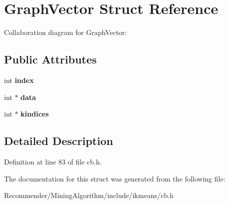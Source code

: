 \section{GraphVector Struct Reference}
\label{structGraphVector}
Collaboration diagram for GraphVector:\subsection*{Public Attributes}
\begin{CompactItemize}
\item 
int {\bf index}\label{structGraphVector_750b5d744c39a06bfb13e6eb010e35d0}

\item 
int $\ast$ {\bf data}\label{structGraphVector_c103627c1ad15cbec2f22d0abe6d54b6}

\item 
int $\ast$ {\bf kindices}\label{structGraphVector_5027d41ca8be64fce844b2ee1d2c36bd}

\end{CompactItemize}


\subsection{Detailed Description}




Definition at line 83 of file cb.h.

The documentation for this struct was generated from the following file:\begin{CompactItemize}
\item 
Recommender/MiningAlgorithm/include/ikmeans/cb.h\end{CompactItemize}

